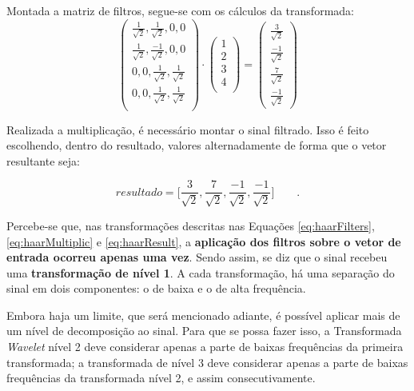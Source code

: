 			\par Montada a matriz de filtros, segue-se com os cálculos da transformada:
			\begin{equation}
				\begin{pmatrix}
					\frac{1}{\sqrt{2}}, \frac{1}{\sqrt{2}}, 0, 0\\
					\frac{1}{\sqrt{2}}, \frac{-1}{\sqrt{2}}, 0, 0\\
					0, 0, \frac{1}{\sqrt{2}}, \frac{1}{\sqrt{2}}\\
					0, 0, \frac{1}{\sqrt{2}}, \frac{1}{\sqrt{2}}\\
				\end{pmatrix} 
				\cdot
				\begin{pmatrix}
					1\\
					2\\
					3\\
					4\\
				\end{pmatrix} 
				=
				\begin{pmatrix}
					\frac{3}{\sqrt{2}}\\
					\frac{-1}{\sqrt{2}}\\
					\frac{7}{\sqrt{2}}\\
					\frac{-1}{\sqrt{2}}
				\end{pmatrix}
				\label{eq:haarMultiplic}
			\end{equation}
			
			\par Realizada a multiplicação, é necessário montar o sinal filtrado. Isso é feito escolhendo, dentro do resultado, valores alternadamente de forma que o vetor resultante seja:

			\begin{equation}
				resultado = \Big[
				\frac{3}{\sqrt{2}},
				\frac{7}{\sqrt{2}},
				\frac{-1}{\sqrt{2}},
				\frac{-1}{\sqrt{2}}
				\Big]\qquad.
				\label{eq:haarResult}
			\end{equation}
			
			\par Percebe-se que, nas transformações descritas nas Equações \ref{eq:haarFilters}, \ref{eq:haarMultiplic} e \ref{eq:haarResult}, a \textbf{aplicação dos filtros sobre o vetor de entrada ocorreu apenas uma vez}. Sendo assim, se diz que o sinal recebeu uma \textbf{transformação de nível 1}. A cada transformação, há uma separação do sinal em dois componentes: o de baixa e o de alta frequência.
			
			\par Embora haja um limite, que será mencionado adiante, é possível aplicar mais de um nível de decomposição ao sinal. Para que se possa fazer isso, a Transformada \textit{Wavelet} nível 2 deve considerar apenas a parte de baixas frequências da primeira transformada; a transformada de nível 3 deve considerar apenas a parte de baixas frequências da transformada nível 2, e assim consecutivamente.
			
